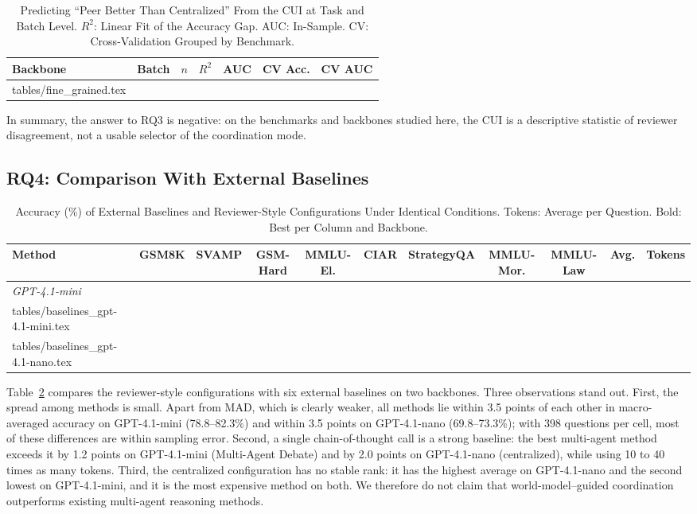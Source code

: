 \documentclass[lettersize,journal]{IEEEtran}
\makeatletter
\newcommand{\tabinput}[1]{\@@input #1 }
\makeatother
\begin{document}
\begin{table}[!t]
\caption{Predicting ``Peer Better Than Centralized'' From the CUI at Task and Batch Level. $R^2$: Linear Fit of the Accuracy Gap. AUC: In-Sample. CV: Cross-Validation Grouped by Benchmark.}
\label{tab:fine}
\centering
\footnotesize
\setlength{\tabcolsep}{3pt}
\begin{tabular}{llccccc}
\toprule
Backbone & Batch & $n$ & $R^2$ & AUC & CV Acc. & CV AUC \\
\midrule
\tabinput{tables/fine_grained.tex}
\bottomrule
\end{tabular}
\end{table}

In summary, the answer to RQ3 is negative: on the benchmarks and backbones studied here, the CUI is a descriptive statistic of reviewer disagreement, not a usable selector of the coordination mode.

\subsection{RQ4: Comparison With External Baselines}
\label{sec:baseline_results}

\begin{table}[!t]
\caption{Accuracy (\%) of External Baselines and Reviewer-Style Configurations Under Identical Conditions. Tokens: Average per Question. Bold: Best per Column and Backbone.}
\label{tab:baselines}
\centering
\footnotesize
\setlength{\tabcolsep}{3.5pt}
\begin{tabular}{l cccccccc c r}
\toprule
Method & GSM8K & SVAMP & GSM-Hard & MMLU-El. & CIAR & StrategyQA & MMLU-Mor. & MMLU-Law & Avg. & Tokens \\
\midrule
\multicolumn{11}{l}{\emph{GPT-4.1-mini}} \\
\tabinput{tables/baselines_gpt-4.1-mini.tex}
\midrule
\multicolumn{11}{l}{\emph{GPT-4.1-nano}} \\
\tabinput{tables/baselines_gpt-4.1-nano.tex}
\bottomrule
\end{tabular}
\end{table}

Table~\ref{tab:baselines} compares the reviewer-style configurations with six external baselines on two backbones.
Three observations stand out.
First, the spread among methods is small. Apart from MAD, which is clearly weaker, all methods lie within 3.5 points of each other in macro-averaged accuracy on GPT-4.1-mini (78.8--82.3\%) and within 3.5 points on GPT-4.1-nano (69.8--73.3\%); with 398 questions per cell, most of these differences are within sampling error.
Second, a single chain-of-thought call is a strong baseline: the best multi-agent method exceeds it by 1.2 points on GPT-4.1-mini (Multi-Agent Debate) and by 2.0 points on GPT-4.1-nano (centralized), while using 10 to 40 times as many tokens.
Third, the centralized configuration has no stable rank: it has the highest average on GPT-4.1-nano and the second lowest on GPT-4.1-mini, and it is the most expensive method on both.
We therefore do not claim that world-model--guided coordination outperforms existing multi-agent reasoning methods.
\end{document}
